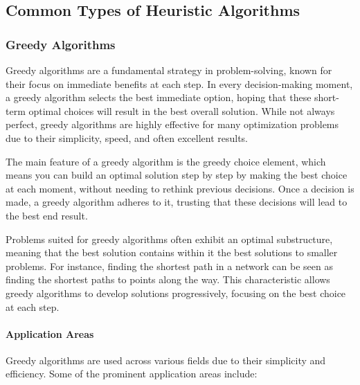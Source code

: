 \documentclass{article}
\begin{document}
    \subsection{Common Types of Heuristic Algorithms}\label{itm:common-types-of-heuristic-algorithms}

    \subsubsection{Greedy Algorithms}
    \label{subsubsec:greedy_algorithms}

    Greedy algorithms are a fundamental strategy in problem-solving, known for their focus on immediate benefits at each step. In every decision-making moment, a greedy algorithm selects the best immediate option, hoping that these short-term optimal choices will result in the best overall solution. While not always perfect, greedy algorithms are highly effective for many optimization problems due to their simplicity, speed, and often excellent results.

    The main feature of a greedy algorithm is the greedy choice element, which means you can build an optimal solution step by step by making the best choice at each moment, without needing to rethink previous decisions. Once a decision is made, a greedy algorithm adheres to it, trusting that these decisions will lead to the best end result.

    Problems suited for greedy algorithms often exhibit an optimal substructure, meaning that the best solution contains within it the best solutions to smaller problems. For instance, finding the shortest path in a network can be seen as finding the shortest paths to points along the way. This characteristic allows greedy algorithms to develop solutions progressively, focusing on the best choice at each step. \cite{izadkhah2022greedy}

    \paragraph{Application Areas}

    Greedy algorithms are used across various fields due to their simplicity and efficiency. Some of the prominent application areas include:
\end{document}

